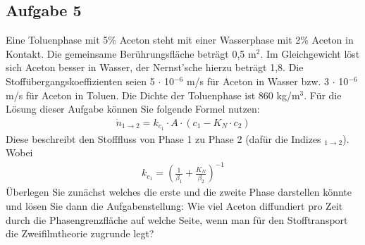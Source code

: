 \documentclass[a4paper,11pt]{article}
\newif\ifshowme
\numberwithin{equation}{section}
\begin{document}
\subsection*{Aufgabe 5}
Eine Toluenphase mit 5\% Aceton steht mit einer Wasserphase mit 2\% Aceton in Kontakt. Die gemeinsame Berührungsfläche beträgt 0,5 m$^2$. Im Gleichgewicht löst sich Aceton besser in Wasser, der Nernst'sche  hierzu beträgt 1,8. Die Stoffübergangskoeffizienten seien 5 $\cdot$ 10$^{-6}$ m/s für Aceton in Wasser bzw. 3 $\cdot$ 10$^{-6}$ m/s für Aceton in Toluen. Die Dichte der Toluenphase ist 860 kg/m$^{3}$.
Für die Lösung dieser Aufgabe können Sie folgende Formel nutzen:
\begin{align}
\dot{n}_{1 \rightarrow 2} = k_{c_1} \cdot A \cdot (c_1 - K_N \cdot c_2)
\end{align}
Diese beschreibt den Stofffluss von Phase 1 zu Phase 2 (dafür die Indizes $_{1 \rightarrow 2}$).
Wobei
\begin{align}
k_{c_1} = \left( \frac{1}{\beta_1} + \frac{K_N}{\beta_2} \right)^{-1}
\end{align}
Überlegen Sie zunächst welches die erste und die zweite Phase darstellen könnte und lösen Sie dann die Aufgabenstellung:
\pp
Wie viel Aceton diffundiert pro Zeit durch die Phasengrenzfläche auf welche Seite, wenn man für den Stofftransport die Zweifilmtheorie zugrunde legt?

\ifshowme
\antwort{
Da der Nernst’sche Verteilungskoeffizient $K_N$ größer als 1 ist und sich Aceton besser in Wasser als in Toluen löst, muss laut der Definition des Nernst'schen Verteilungskoeffizienten die Wasserphase als Phase 1 und die Toluenphase als Phase 2 bezeichnet werden. 
\begin{align*}
\dot{n}_{1 \rightarrow 2} &= \frac{ A \cdot (c_1 - K_N \cdot c_2)}{\frac{1}{\beta_1} + \frac{K_N}{\beta_2}} \\
&= \frac{ 0,5~\text{m}^2 \cdot (0,02 \cdot 1.000 - 1,8 \cdot 0,05 \cdot 860)}{\frac{1}{5 \cdot 10^{-6}} + \frac{1,8}{3 \cdot 10^{-6}}} \\ 
&= \frac{-28,7~\text{kg}}{8 \cdot 10^5 ~\text{s}} \\
&= -3,59 \cdot 10^{-5} ~\text{kg/s} \qquad \approx -0,036~\text{g/s} 
\end{align*}
}
\else
\fi
\end{document}
